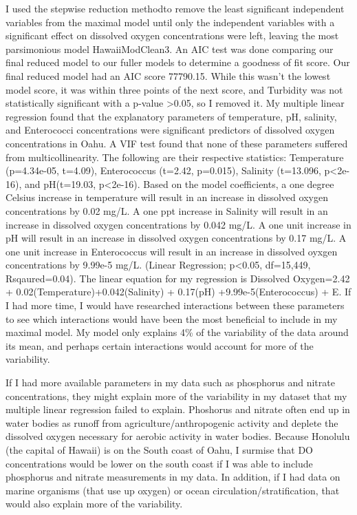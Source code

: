 \documentclass[12pt,]{article}
\begin{document}
I used the stepwise reduction methodto remove the least significant
independent variables from the maximal model until only the independent
variables with a significant effect on dissolved oxygen concentrations
were left, leaving the most parsimonious model HawaiiModClean3. An AIC
test was done comparing our final reduced model to our fuller models to
determine a goodness of fit score. Our final reduced model had an AIC
score 77790.15. While this wasn't the lowest model score, it was within
three points of the next score, and Turbidity was not statistically
significant with a p-value \textgreater{}0.05, so I removed it. My
multiple linear regression found that the explanatory parameters of
temperature, pH, salinity, and Enterococci concentrations were
significant predictors of dissolved oxygen concentrations in Oahu. A VIF
test found that none of these parameters suffered from
multicollinearity. The following are their respective statistics:
Temperature (p=4.34e-05, t=4.09), Enterococcus (t=2.42, p=0.015),
Salinity (t=13.096, p\textless{}2e-16), and pH(t=19.03,
p\textless{}2e-16). Based on the model coefficients, a one degree
Celsius increase in temperature will result in an increase in dissolved
oxygen concentrations by 0.02 mg/L. A one ppt increase in Salinity will
result in an increase in dissolved oxygen concentrations by 0.042 mg/L.
A one unit increase in pH will result in an increase in dissolved oxygen
concentrations by 0.17 mg/L. A one unit increase in Enterococcus will
result in an increase in dissolved oyxgen concentrations by 9.99e-5
mg/L. (Linear Regression; p\textless{}0.05, df=15,449, Rsqaured=0.04).
The linear equation for my regression is Dissolved Oxygen=2.42 +
0.02(Temperature)+0.042(Salinity) + 0.17(pH) +9.99e-5(Enterococcus) + E.
If I had more time, I would have researched interactions between these
parameters to see which interactions would have been the most beneficial
to include in my maximal model. My model only explains 4\% of the
variability of the data around its mean, and perhaps certain
interactions would account for more of the variability.

If I had more available parameters in my data such as phosphorus and
nitrate concentrations, they might explain more of the variability in my
dataset that my multiple linear regression failed to explain. Phoshorus
and nitrate often end up in water bodies as runoff from
agriculture/anthropogenic activity and deplete the dissolved oxygen
necessary for aerobic activity in water bodies. Because Honolulu (the
capital of Hawaii) is on the South coast of Oahu, I surmise that DO
concentrations would be lower on the south coast if I was able to
include phosphorus and nitrate measurements in my data. In addition, if
I had data on marine organisms (that use up oxygen) or ocean
circulation/stratification, that would also explain more of the
variability.
\end{document}
